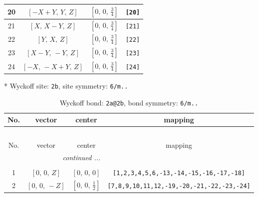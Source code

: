 \documentclass[fleqn,8pt]{jsarticle}
\begin{document}
\begin{longtable}{cccc}
20 & $\left[ - X + Y,\, Y,\, Z \right]$ & $\left[ 0,\, 0,\, \frac{3}{4} \right]$ & {\tt [20]} \\ \hline
21 & $\left[ X,\, X - Y,\, Z \right]$ & $\left[ 0,\, 0,\, \frac{3}{4} \right]$ & {\tt [21]} \\ \hline
22 & $\left[ Y,\, X,\, Z \right]$ & $\left[ 0,\, 0,\, \frac{3}{4} \right]$ & {\tt [22]} \\ \hline
23 & $\left[ X - Y,\, - Y,\, Z \right]$ & $\left[ 0,\, 0,\, \frac{3}{4} \right]$ & {\tt [23]} \\ \hline
24 & $\left[ - X,\, - X + Y,\, Z \right]$ & $\left[ 0,\, 0,\, \frac{3}{4} \right]$ & {\tt [24]} \\
\end{longtable}
* Wyckoff site: {\tt 2b}, site symmetry: {\tt 6/m..}
\renewcommand{\arraystretch}{1.2}
\begin{longtable}{cccc}
\caption{Wyckoff bond: {\tt 2a@2b}, bond symmetry: {\tt 6/m..}}
 \\
 \hline \hline
No. & vector & center & mapping \\ \hline \endfirsthead

\multicolumn{3}{l}{\tablename\ \thetable{}} \\
 \hline \hline
No. & vector & center & mapping \\ \hline \endhead

 \hline \hline
\multicolumn{3}{r}{\footnotesize\it continued ...} \\ \endfoot

 \hline \hline
\multicolumn{3}{r}{} \\ \endlastfoot

1 & $\left[ 0,\, 0,\, Z \right]$ & $\left[ 0,\, 0,\, 0 \right]$ & {\tt [1,2,3,4,5,6,-13,-14,-15,-16,-17,-18]} \\ \hline
2 & $\left[ 0,\, 0,\, - Z \right]$ & $\left[ 0,\, 0,\, \frac{1}{2} \right]$ & {\tt [7,8,9,10,11,12,-19,-20,-21,-22,-23,-24]} \\
\end{longtable}
\renewcommand{\arraystretch}{1.2}
\end{document}
